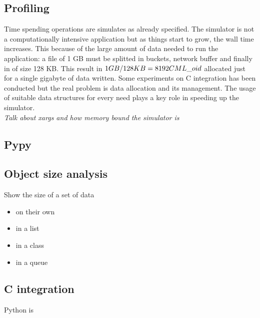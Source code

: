 \subsection{Profiling}\label{profiling}
Time spending operations are simulates as already specified. The simulator is
not a computationally intensive application but as things start to grow, the
wall time increases. This because of the large amount of data needed to run the
application: a file of 1 GB must be splitted in buckets, network buffer and
finally in \cmloid of size 128 KB. This result in $1GB / 128KB = 8192 CML\_oid$
allocated just for a single gigabyte of data written. Some experiments on C
integration has been conducted but the real problem is data allocation and its
management. The usage of suitable data structures for every need plays a key
role in speeding up the simulator. \\
\textit{Talk about xargs and how memory bound the simulator is}


\subsection{Pypy}

\subsection{Object size analysis}
Show the size of a set of data
\begin{itemize}
    \item on their own
    \item in a list
    \item in a class
    \item in a queue
\end{itemize}

\subsection{C integration}
Python is

